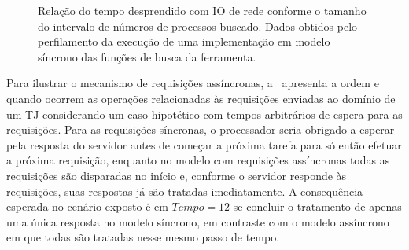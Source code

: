 \begin{figure}[htb]
    \centering
    \caption{%
        Relação do tempo desprendido com IO de rede conforme o tamanho do
        intervalo de números de processos buscado. Dados obtidos pelo
        perfilamento da execução de uma implementação em modelo síncrono das
        funções de busca da ferramenta.
    }
    \label{gra:tempo-io-por-num-processos}
\end{figure}

Para ilustrar o mecanismo de requisições assíncronas,
a~ apresenta a ordem e quando ocorrem
as operações relacionadas às requisições enviadas ao domínio de um TJ
considerando um caso hipotético com tempos arbitrários de espera para as
requisições. Para as requisições síncronas, o processador seria obrigado a
esperar pela resposta do servidor antes de começar a próxima tarefa para só
então efetuar a próxima requisição, enquanto no modelo com requisições
assíncronas todas as requisições são disparadas no início e, conforme o
servidor responde às requisições, suas respostas já são tratadas imediatamente.
A consequência esperada no cenário exposto é em $Tempo = 12$ se concluir o
tratamento de apenas uma única resposta no modelo síncrono, em contraste com o
modelo assíncrono em que todas são tratadas nesse mesmo passo de tempo.

